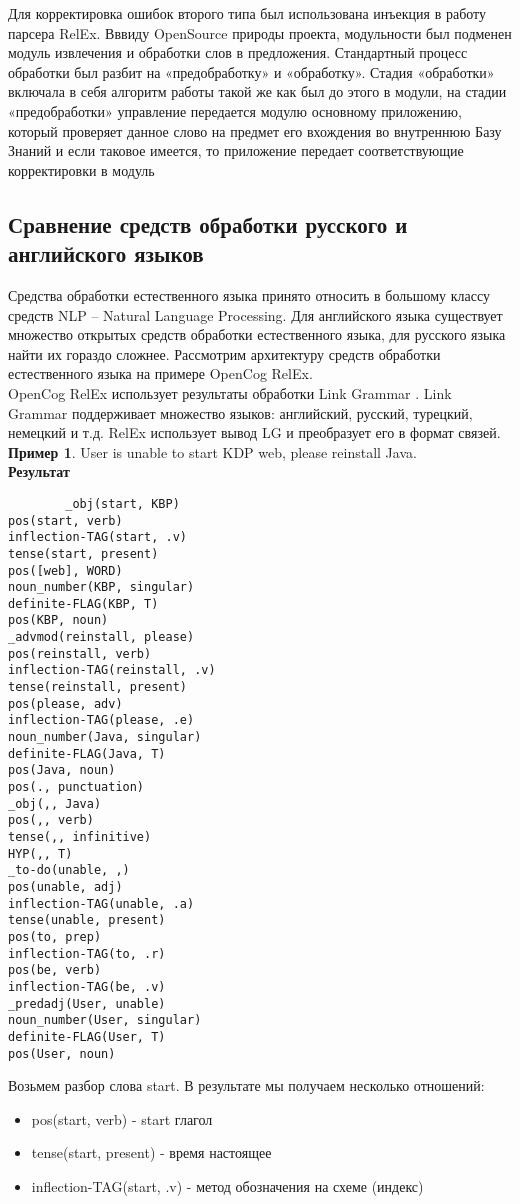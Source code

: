 Для корректировка ошибок второго типа был использована инъекция в работу парсера RelEx. Вввиду OpenSource природы проекта, модульности был подменен модуль извлечения и обработки слов в предложения. Стандартный процесс обработки был разбит на «предобработку» и «обработку». Стадия «обработки» включала в себя алгоритм работы такой же как был до этого в модули, на стадии «предобработки» управление передается модулю основному приложению, который проверяет данное слово на предмет его вхождения во внутреннюю Базу Знаний и если таковое имеется, то приложение передает соответствующие корректировки в модуль

\clearpage
\subsection{Сравнение средств обработки русского и английского языков} \label{sect2_3}
Средства обработки естественного языка принято относить в большому классу средств NLP – Natural Language Processing. Для английского языка существует множество открытых средств обработки естественного языка, для русского языка найти их гораздо сложнее. Рассмотрим архитектуру средств обработки естественного языка на примере OpenCog RelEx. \\
OpenCog RelEx использует результаты обработки Link Grammar \cite{linkgrammar}. Link Grammar поддерживает множество языков: английский, русский, турецкий, немецкий и т.д.  RelEx использует вывод LG и преобразует его в формат связей.
\textbf{Пример 1}. User is unable to start KDP web, please reinstall Java.\\
\textbf{Результат} 
\begin{verbatim}
		_obj(start, KBP)
pos(start, verb)
inflection-TAG(start, .v)
tense(start, present)
pos([web], WORD)
noun_number(KBP, singular)
definite-FLAG(KBP, T)
pos(KBP, noun)
_advmod(reinstall, please)
pos(reinstall, verb)
inflection-TAG(reinstall, .v)
tense(reinstall, present)
pos(please, adv)
inflection-TAG(please, .e)
noun_number(Java, singular)
definite-FLAG(Java, T)
pos(Java, noun)
pos(., punctuation)
_obj(,, Java)
pos(,, verb)
tense(,, infinitive)
HYP(,, T)
_to-do(unable, ,)
pos(unable, adj)
inflection-TAG(unable, .a)
tense(unable, present)
pos(to, prep)
inflection-TAG(to, .r)
pos(be, verb)
inflection-TAG(be, .v)
_predadj(User, unable)
noun_number(User, singular)
definite-FLAG(User, T)
pos(User, noun)

\end{verbatim}



Возьмем разбор слова start. В результате мы получаем несколько отношений:
\begin{itemize}
	\item pos(start, verb) - start глагол
	\item tense(start, present) - время настоящее
	\item inflection-TAG(start, .v) -  метод обозначения на схеме (индекс)
\end{itemize}

